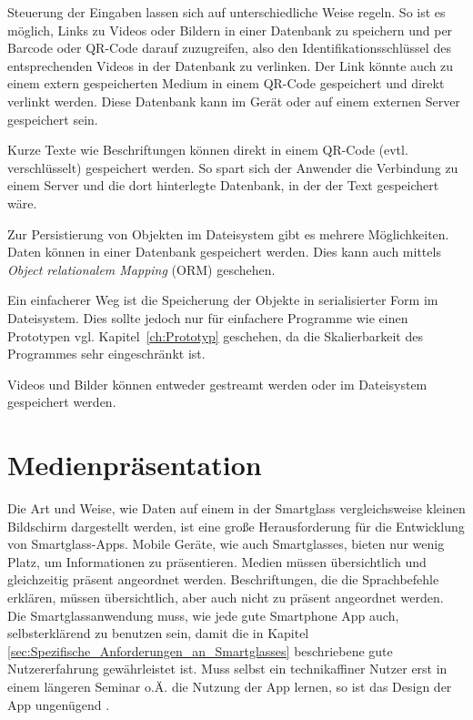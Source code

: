Steuerung der Eingaben lassen sich auf unterschiedliche Weise regeln. So ist es möglich, Links zu Videos oder Bildern in einer Datenbank zu speichern und per Barcode oder QR-Code darauf zuzugreifen, also den Identifikationsschlüssel des entsprechenden Videos in der Datenbank zu verlinken. Der Link könnte auch zu einem extern gespeicherten Medium in einem QR-Code gespeichert und direkt verlinkt werden. Diese Datenbank kann im Gerät oder auf einem externen Server gespeichert sein. 

Kurze Texte wie Beschriftungen können direkt in einem QR-Code (evtl. verschlüsselt) gespeichert werden. So spart sich der Anwender die Verbindung zu einem Server und die dort hinterlegte Datenbank, in der der Text gespeichert wäre.

Zur Persistierung von Objekten im Dateisystem gibt es mehrere Möglichkeiten. Daten können in einer Datenbank gespeichert werden. Dies kann auch mittels \emph{Object relationalem Mapping} (ORM) geschehen.

Ein einfacherer Weg ist die Speicherung der Objekte in serialisierter Form im Dateisystem. Dies sollte jedoch nur für einfachere Programme wie einen Prototypen vgl. Kapitel~\ref{ch:Prototyp} geschehen, da die Skalierbarkeit des Programmes sehr eingeschränkt ist.

Videos und Bilder können entweder gestreamt werden oder im Dateisystem gespeichert werden.
%
%
%
%
%
%
\section{Medienpräsentation}
\label{sec:Medienpraesentation}
Die Art und Weise, wie Daten auf einem in der Smartglass vergleichsweise kleinen Bildschirm dargestellt werden, ist eine große Herausforderung für die Entwicklung von Smartglass-Apps. Mobile Geräte, wie auch Smartglasses, bieten nur wenig Platz, um Informationen zu präsentieren. Medien müssen übersichtlich und gleichzeitig präsent angeordnet werden. Beschriftungen, die die Sprachbefehle erklären, müssen übersichtlich, aber auch nicht zu präsent angeordnet werden. Die Smartglassanwendung muss, wie jede gute Smartphone App auch, selbsterklärend zu benutzen sein, damit die in Kapitel \ref{sec:Spezifische_Anforderungen_an_Smartglasses} beschriebene gute Nutzererfahrung gewährleistet ist. 
Muss selbst ein technikaffiner Nutzer erst in einem längeren Seminar o.Ä. die Nutzung der App lernen, so ist das Design der App ungenügend \cite{Hoober2011} \cite[S.~141ff]{Norman2013}.

